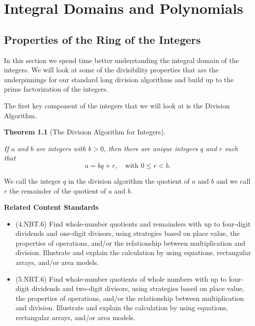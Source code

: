 \documentclass[
]{book}
\providecommand{\tightlist}{%
  \setlength{\itemsep}{0pt}\setlength{\parskip}{0pt}}
\newenvironment{standards}{}{}
\newtheorem{theorem}{Theorem}[chapter]
\theoremstyle{definition}
\theoremstyle{definition}
\theoremstyle{definition}
\theoremstyle{definition}
\theoremstyle{remark}
\begin{document}
\hypertarget{ch:rings}{%
\chapter{Integral Domains and Polynomials}\label{ch:rings}}

\hypertarget{sec:Integer-Ring}{%
\section{Properties of the Ring of the Integers}\label{sec:Integer-Ring}}

In this section we spend time better understanding the integral domain of the integers. We will look at some of the divisibility properties that are the underpinnings for our standard long division algorithms and build up to the prime factorization of the integers.

The first key component of the integers that we will look at is the Division Algorithm.

\begin{theorem}[The Division Algorithm for Integers]
\protect\hypertarget{thm:division-algorithm}{}\label{thm:division-algorithm}

If \(a\) and \(b\) are integers with \(b>0\), then there are unique integers \(q\) and \(r\) such that \[a=bq+r, \quad \mbox{with } 0\leq r <b.\]

\end{theorem}

We call the integer \(q\) in the division algorithm the quotient of \(a\) and \(b\) and we call \(r\) the remainder of the quotient of \(a\) and \(b\).

\begin{standards}

\begin{center}
\textbf{Related Content Standards}

\end{center}

\begin{itemize}
\tightlist
\item
  (4.NBT.6) Find whole-number quotients and remainders with up to four-digit dividends and one-digit divisors, using strategies based on place value, the properties of operations, and/or the relationship between multiplication and division. Illustrate and explain the calculation by using equations, rectangular arrays, and/or area models.
\item
  (5.NBT.6) Find whole-number quotients of whole numbers with up to four-digit dividends and two-digit divisors, using strategies based on place value, the properties of operations, and/or the relationship between multiplication and division. Illustrate and explain the calculation by using equations, rectangular arrays, and/or area models.
\end{itemize}

\end{standards}
\end{document}
